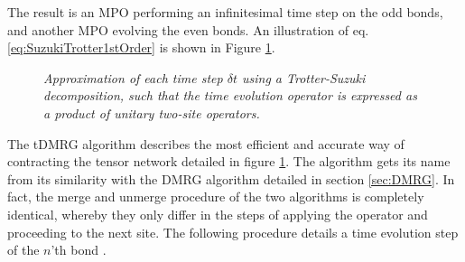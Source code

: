 The result is an MPO performing an infinitesimal time step on the odd bonds, and another MPO evolving the even bonds. An illustration of eq. \eqref{eq:SuzukiTrotter1stOrder} is shown in Figure \ref{fig:oddevenops}.
\begin{figure}[h!]
	\centering
	
	\caption{\textit{Approximation of each time step $\delta t$ using a Trotter-Suzuki decomposition, such that the time evolution operator is expressed as a product of unitary two-site operators.}}
	\label{fig:oddevenops}
\end{figure}
The tDMRG algorithm describes the most efficient and accurate way of contracting the tensor network detailed in figure \ref{fig:oddevenops}. The algorithm gets its name from its similarity with the DMRG algorithm detailed in section \ref{sec:DMRG}. In fact, the merge and unmerge procedure of the two algorithms is completely identical, whereby they only differ in the steps of applying the operator and proceeding to the next site. The following procedure details a time evolution step of the $n$'th bond \cite{schollwock}.

